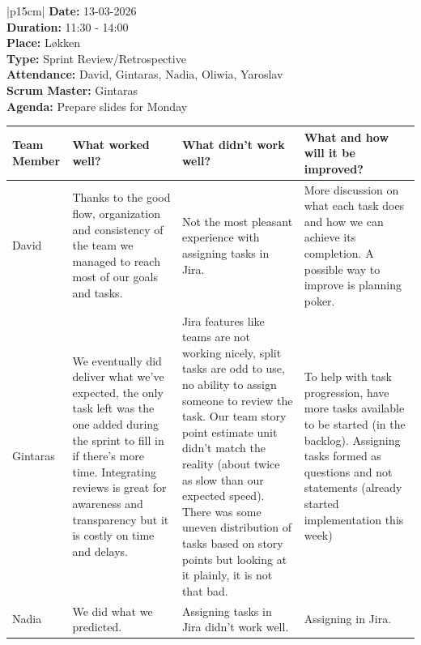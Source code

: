 \begin{table}[H]
    \centering
    \begin{tabular}{|p{15cm}|}   
        \hline
        \textbf{Date:}  13-03-2026 \\
        \textbf{Duration:} 11:30 - 14:00 \\
        \textbf{Place:}  Løkken \\
        \textbf{Type:} Sprint Review/Retrospective\\
        \textbf{Attendance:} David, Gintaras, Nadia, Oliwia, Yaroslav \\
        \textbf{Scrum Master:} Gintaras \\
        \textbf{Agenda:}  Prepare slides for Monday
        \begin{table}[H]
            \begin{tabular}{|p{1.75cm}|p{4cm}|p{4cm}|p{4cm}|}
                \hline
                \cellcolor[HTML]{BFBFBF}  \textbf{Team Member} & \cellcolor[HTML]{BFBFBF} \textbf{What worked well?} & \cellcolor[HTML]{BFBFBF}  \textbf{What didn’t work well?} & \cellcolor[HTML]{BFBFBF}  \textbf{What and how will it be improved?}\\
                \hline
                \cellcolor[HTML]{d4d4d4} David & Thanks to the good flow, organization and consistency of the team we managed to reach most of our goals and tasks. & Not the most pleasant experience with assigning tasks in Jira. & More discussion on what each task does and how we can achieve its completion. A possible way to improve is planning poker. \\
                \hline
                \cellcolor[HTML]{d4d4d4} Gintaras & We eventually did deliver what we've expected, the only task left was the one added during the sprint to fill in if there's more time. Integrating reviews is great for awareness and transparency but it is costly on time and delays. & Jira features like teams are not working nicely, split tasks are odd to use, no ability to assign someone to review the task. Our team story point estimate unit didn't match the reality (about twice as slow than our expected speed). There was some uneven distribution of tasks based on story points but looking at it plainly, it is not that bad. & To help with task progression, have more tasks available to be started (in the backlog). Assigning tasks formed as questions and not statements (already started implementation this week) \\
                \hline
                \cellcolor[HTML]{d4d4d4} Nadia & We did what we predicted. & Assigning tasks in Jira didn't work well. & Assigning in Jira. \\
                \hline
            \end{tabular}
        \end{table} 
        \\
        \hline
    \end{tabular}
\end{table}
